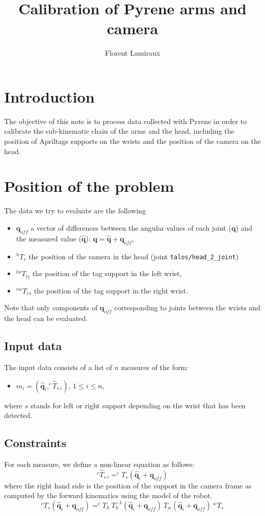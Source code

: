 \documentclass {article}
\title {Calibration of Pyrene arms and camera}
\author {Florent Lamiraux}
\date {}
\newcommand\conf{\mathbf{q}}
\newcommand\confoffset{\mathbf{q}_{off}}
\newcommand\transf{T}
\begin{document}
\maketitle
\section {Introduction}

The objective of this note is to process data collected with Pyrene in order
to calibrate the sub-kinematic chain of the arms and the head, including the
position of Apriltags supports on the wrists and the position of the camera on the head.

\section {Position of the problem}

The data we try to evaluate are the following
\begin{itemize}
\item $\confoffset$ a vector of differences between the angular values of each joint ($\conf$) and the measured value ($\hat{\conf}$): $\conf = \hat{\conf} + \confoffset$,
\item $^{h}\transf_{c}$ the position of the camera in the head (joint \texttt{talos/head\_2\_joint})
\item $^{lw}\transf_{ls}$ the position of the tag support in the left wrist,
\item $^{rw}\transf_{rs}$ the position of the tag support in the right wrist.
\end{itemize}
Note that only components of $\confoffset$ corresponding to joints between the wrists and the head can be evaluated.

\subsection {Input data}

The input data consists of a list of $n$ measures of the form:
\begin{itemize}
  \item $m_i = (\hat{\conf}_i, ^{c}\hat\transf_{s\ i})$, $1 \leq i \leq n$,
\end{itemize}
where $s$ stands for left or right support depending on the wrist that has been detected.

\subsection {Constraints}

For each measure, we define a non-linear equation as follows:
$$
^{c}\hat{\transf}_{s\ i} = ^{c}{\transf}_{s} (\hat{\conf}_{i} + \confoffset)
$$
where the right hand side is the position of the support in the camera frame as
computed by the forward kinematics using the model of the robot.
$$
^{c}{\transf}_{s} (\hat{\conf}_{i} + \confoffset) = ^{c}{\transf}_{h}\ {\transf}_{h}^{-1}(\hat{\conf}_{i} + \confoffset)\ {\transf}_{w} (\hat{\conf}_{i} + \confoffset)\ ^{w}{\transf}_{s}
$$
\end{document}
